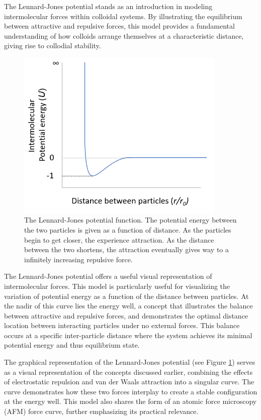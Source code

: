 The Lennard-Jones potential stands as an introduction in modeling intermolecular forces within colloidal systems. By illustrating the equilibrium between attractive and repulsive forces, this model provides a fundamental understanding of how colloids arrange themselves at a characteristic distance, giving rise to collodial stability.

\begin{figure}[h!!]     %
        \begin{center}
          \includegraphics[width=100mm]{chapter1/Lennard's potato.PNG}
\end{center}
\caption{The Lennard-Jones potential function. The potential energy between the two particles is given as a function of distance. As the particles begin to get closer, the experience attraction. As the distance between the two shortens, the attraction eventually gives way to a infinitely increasing repulsive force.}
\label{fig:potato}                 %
\end{figure}

The Lennard-Jones potential offers a useful visual representation of intermolecular forces. This model is particularly useful for visualizing the variation of potential energy as a function of the distance between particles. At the nadir of this curve lies the energy well, a concept that illustrates the balance between attractive and repulsive forces, and demonstrates the optimal distance location between interacting particles under no external forces. This balance occurs at a specific inter-particle distance where the system achieves its minimal potential energy and thus equilibrium state.

The graphical representation of the Lennard-Jones potential (see Figure \ref{fig:potato}) serves as a visual representation of the concepts discussed earlier, combining the effects of electrostatic repulsion and van der Waals attraction into a singular curve. The curve demonstrates how these two forces interplay to create a stable configuration at the energy well. This model also shares the form of an atomic force microscopy (AFM) force curve, further emphasizing its practical relevance. 

